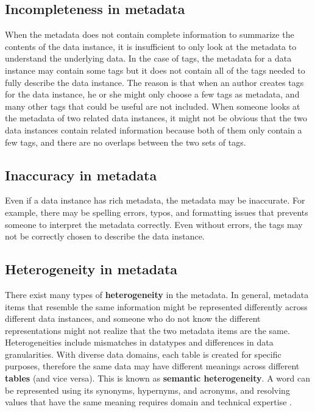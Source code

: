 \subsection{Incompleteness in metadata}

When the metadata does not contain complete information to summarize the contents of the data instance, it is insufficient to only look at the metadata to understand the underlying data. In the case of tags, the metadata for a data instance may contain some tags but it does not contain all of the tags needed to fully describe the data instance. The reason is that when an author creates tags for the data instance, he or she might only choose a few tags as metadata, and many other tags that could be useful are not included. When someone looks at the metadata of two related data instances, it might not be obvious that the two data instances contain related information because both of them only contain a few tags, and there are no overlaps between the two sets of tags.

\subsection{Inaccuracy in metadata}

Even if a data instance has rich metadata, the metadata may be inaccurate. For example, there may be spelling errors, typos, and formatting issues that prevents someone to interpret the metadata correctly. Even without errors, the tags may not be correctly chosen to describe the data instance.

\subsection{Heterogeneity in metadata}

There exist many types of \textbf{\gls{heterogeneity}} in the metadata. In general, metadata items that resemble the same information might be represented differently across different data instances, and someone who do not know the different representations might not realize that the two metadata items are the same. Heterogeneities include mismatches in datatypes and differences in data granularities. With diverse data domains, each table is created for specific purposes, therefore the same data may have different meanings across different \textbf{\glspl{table}} (and vice versa). This is known as \textbf{\gls{semantic heterogeneity}}. A word can be represented using its synonyms, hypernyms, and acronyms, and resolving values that have the same meaning requires domain and technical expertise \cite{Halevy2005Why}.

